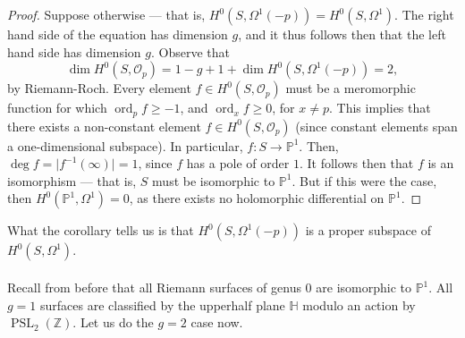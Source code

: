\documentclass[a4paper]{report}
\theoremstyle{definition}
\theoremstyle{remark}
\theoremstyle{proposition}
\theoremstyle{conjecture}
\theoremstyle{lemma}
\theoremstyle{corollary}
\theoremstyle{exercise}
\theoremstyle{example}
\newcommand{\mcal}{\mathcal}
\newcommand{\on}{\operatorname}
\begin{document}
\begin{proof}
    Suppose otherwise --- that is, $H^0(S,\Omega^1(-p)) = H^0(S,\Omega^1)$.
    The right hand side of the equation has dimension $g$, and it thus 
    follows then that the left hand side has dimension $g$.
    Observe that 
    $$\dim H^0(S,\mcal{O}_p) = 1-g + 1 + \dim H^0(S,\Omega^1(-p)) = 2,$$
    by Riemann-Roch. Every element $f\in H^0(S,\mcal{O}_p)$ must be a 
    meromorphic function for which $\on{ord}_pf \geq -1$, and $\on{ord}_xf\geq 0$, for $x\neq p$.
    This implies that there exists a non-constant element 
    $f \in H^0(S,\mcal{O}_p)$ (since constant elements span a one-dimensional
    subspace). In particular, $f: S  \to \mathbb{P}^1$.
    Then, $\deg f = \vert f^{-1}(\infty)\vert = 1$, since 
    $f$ has a pole of order $1$. It follows then that $f$ is an isomorphism ---
    that is, $S$ must be isomorphic to $\mathbb{P}^1$. But if this were 
    the case, then $H^0(\mathbb{P}^1,\Omega^1) = 0$, as there exists no 
    holomorphic differential on $\mathbb{P}^1$.
\end{proof}

What the corollary tells us is that 
$H^0(S,\Omega^1(-p))$ is a proper subspace of $H^0(S,\Omega^1)$.\\\\
Recall from before that all Riemann surfaces of genus $0$ are isomorphic to 
$\mathbb{P}^1$. All $g=1$ surfaces are classified by the upperhalf plane 
$\mathbb{H}$ modulo an action by $\on{PSL}_2(\mathbb{Z})$. Let us
do the $g=2$ case now.
\end{document}
